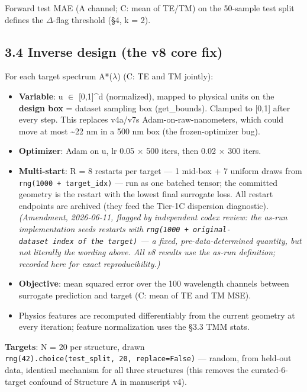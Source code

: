 \documentclass[11pt,a4paper]{article}
\providecommand{\tightlist}{\setlength{\itemsep}{0pt}\setlength{\parskip}{0pt}}
\begin{document}
Forward test MAE (A channel; C: mean of TE/TM) on the 50-sample test split
defines the \ensuremath{\Delta}-flag threshold (\S{}4, k = 2).

\subsection*{3.4 Inverse design (the v8 core fix)}

For each target spectrum A*(\ensuremath{\lambda}) (C: TE and TM jointly):

\begin{itemize}
\tightlist
\item
  \textbf{Variable}: u \ensuremath{\in} {[}0,1{]}\textasciicircum{}d (normalized), mapped to physical units on the
  \textbf{design box} = dataset sampling box (get\_bounds). Clamped to {[}0,1{]} after
  every step. This replaces v4a/v7\textquotesingle s Adam-on-raw-nanometers, which could move
  at most \textasciitilde22 nm in a 500 nm box (the frozen-optimizer bug).
\item
  \textbf{Optimizer}: Adam on u, lr 0.05 \ensuremath{\times} 500 iters, then 0.02 \ensuremath{\times} 300 iters.
\item
  \textbf{Multi-start}: R = 8 restarts per target --- 1 mid-box + 7 uniform draws
  from \texttt{rng(1000\ +\ target\_idx)} --- run as one batched tensor; the committed
  geometry is the restart with the lowest final surrogate loss. All restart
  endpoints are archived (they feed the Tier-1C dispersion diagnostic).
  \emph{(Amendment, 2026-06-11, flagged by independent codex review: the as-run
  implementation seeds restarts with \texttt{rng(1000\ +\ original-dataset\ index\ of\ the\ target)} --- a fixed, pre-data-determined quantity, but not literally
  the wording above. All v8 results use the as-run definition; recorded
  here for exact reproducibility.)}
\item
  \textbf{Objective}: mean squared error over the 100 wavelength channels between
  surrogate prediction and target (C: mean of TE and TM MSE).
\item
  Physics features are recomputed differentiably from the current geometry at
  every iteration; feature normalization uses the \S{}3.3 TMM stats.
\end{itemize}

\textbf{Targets}: N = 20 per structure, drawn \texttt{rng(42).choice(test\_split,\ 20,\ replace=False)} --- random, from held-out data, identical mechanism for all
three structures (this removes the curated-6-target confound of Structure A
in manuscript v4).
\end{document}
